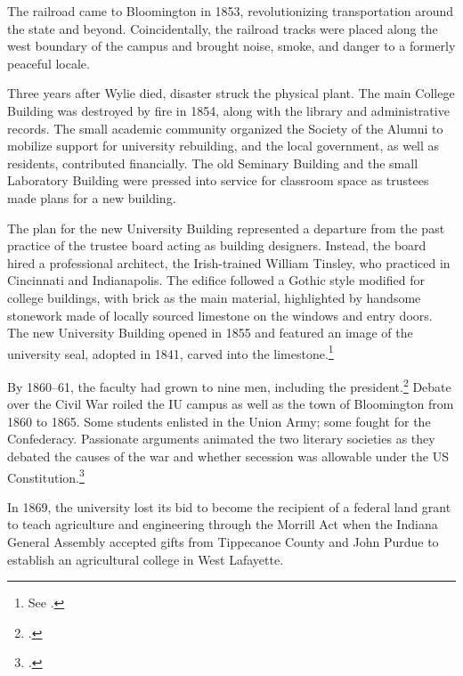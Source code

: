 \documentclass[
  american,
  letterpaper,
]{scrreprt}
\begin{document}
The railroad came to Bloomington in 1853, revolutionizing transportation
around the state and beyond. Coincidentally, the railroad tracks were
placed along the west boundary of the campus and brought noise, smoke,
and danger to a formerly peaceful locale.

Three years after Wylie died, disaster struck the physical plant. The
main College Building was destroyed by fire in 1854, along with the
library and administrative records. The small academic community
organized the Society of the Alumni to mobilize support for university
rebuilding, and the local government, as well as residents, contributed
financially. The old Seminary Building and the small Laboratory Building
were pressed into service for classroom space as trustees made plans for
a new building.

The plan for the new University Building represented a departure from
the past practice of the trustee board acting as building designers.
Instead, the board hired a professional architect, the Irish-trained
William Tinsley, who practiced in Cincinnati and Indianapolis. The
edifice followed a Gothic style modified for college buildings, with
brick as the main material, highlighted by handsome stonework made of
locally sourced limestone on the windows and entry doors. The new
University Building opened in 1855 and featured an image of the
university seal, adopted in 1841, carved into the limestone.\footnote{See
  .}

By 1860--61, the faculty had grown to nine men, including the
president.\footnote{.} Debate over the Civil War roiled
the IU campus as well as the town of Bloomington from 1860 to 1865. Some
students enlisted in the Union Army; some fought for the Confederacy.
Passionate arguments animated the two literary societies as they debated
the causes of the war and whether secession was allowable under the US
Constitution.\footnote{.}

In 1869, the university lost its bid to become the recipient of a
federal land grant to teach agriculture and engineering through the
Morrill Act when the Indiana General Assembly accepted gifts from
Tippecanoe County and John Purdue to establish an agricultural college
in West Lafayette.
\end{document}

